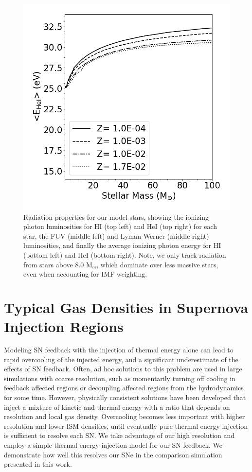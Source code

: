 \documentclass[fleqn,usenatbib,useAMS]{mnras}
\newcommand{\msun}{M$_{\odot}$}
\begin{document}
\begin{figure}
\includegraphics[width=0.4\linewidth]{E1}
\caption{Radiation properties for our model stars, showing the ionizing photon luminosities for HI (top left) and HeI (top right) for each star, the FUV (middle left) and Lyman-Werner (middle right) luminosities, and finally the average ionizing photon energy for HI (bottom left) and HeI (bottom right). Note, we only track radiation from stars above 8.0 \msun, which dominate over less massive stars, even when accounting for IMF weighting.}
\label{fig:stellar radiation properties}
\end{figure}

\setcounter{figure}{0}
\section{Typical Gas Densities in Supernova Injection Regions}
\label{appendix:SN}

Modeling SN feedback with the injection of thermal energy alone can lead to rapid overcooling of the injected energy, and a significant underestimate of the effects of SN feedback. Often, ad hoc solutions to this problem are used in large simulations with coarse resolution, such as momentarily turning off cooling in feedback affected regions or decoupling affected regions from the hydrodynamics for some time. However, physically consistent solutions have been developed \citep[e.g][]{Simpson2016} that inject a mixture of kinetic and thermal energy with a ratio that depends on resolution and local gas density. Overcooling becomes less important with higher resolution and lower ISM densities, until eventually pure thermal energy injection is sufficient to resolve each SN. We take advantage of our high resolution and employ a simple thermal energy injection model for our SN feedback. We demonstrate how well this resolves our SNe in the comparison simulation presented in this work.
\end{document}
